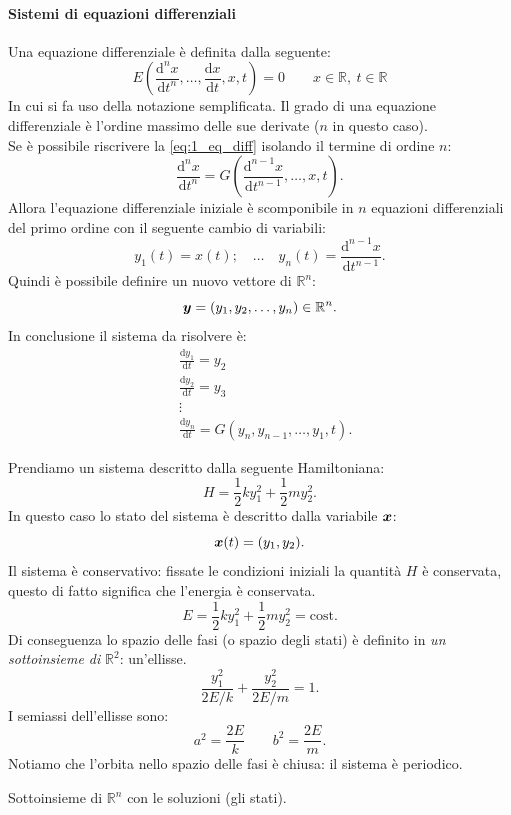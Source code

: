 \paragraph{Sistemi di equazioni differenziali}%
\label{par:Sistemi di equazioni differenziali}
Una equazione differenziale è definita dalla seguente:
\begin{equation}
    E\left(\frac{\text{d} ^n x}{\text{d} t^n} , \ldots, \frac{\text{d} x}{\text{d} t}, x, t\right) = 0 
    \qquad
    x \in \mathbb{R}, \ t \in \mathbb{R}
    \label{eq:1_eq_diff}
\end{equation}
In cui si fa uso della notazione semplificata. Il grado di una equazione differenziale è l'ordine massimo delle sue derivate ($n$ in questo caso).\\
Se è possibile riscrivere la \ref{eq:1_eq_diff} isolando il termine di ordine $n$:
\[
    \frac{\text{d}^n x}{\text{d} t^n} = G\left(\frac{\text{d} ^{n-1}x}{\text{d} t^{n-1}} , \ldots, x, t\right)
.\] 
Allora l'equazione differenziale iniziale è scomponibile in $n$  equazioni differenziali del primo ordine con il seguente cambio di variabili:
\[
    y_1(t) = x(t); \quad \ldots \quad y_n(t) = \frac{\text{d} ^{n-1}x}{\text{d} t^{n-1}} 
.\] 
Quindi è possibile definire un nuovo vettore di $\mathbb{R}^n$:
\[
    \boldsymbol{y}  = (y_1, y_2, \ldots, y_n) \in \mathbb{R}^n
.\] 
In conclusione il sistema da risolvere è:
\[\begin{aligned}
    & \frac{\text{d} y_1}{\text{d} t} = y_2\\
    & \frac{\text{d} y_2}{\text{d} t} = y_3\\
    & \vdots\\
    & \frac{\text{d} y_n}{\text{d} t} = G(y_n, y_{n-1}, \ldots, y_1, t)
.\end{aligned}\]
\begin{exmp}
    Prendiamo un sistema descritto dalla seguente Hamiltoniana:
    \[
        H = \frac{1}{2}ky_1^2 + \frac{1}{2}m y_2^2
    .\] 
    In questo caso lo stato del sistema è descritto dalla variabile $\boldsymbol{x}$:
    \[
	\boldsymbol{x}(t) = (y_1, y_2)
    .\] 
    Il sistema è conservativo: fissate le condizioni iniziali la quantità $H$ è conservata, questo di fatto significa che l'energia è conservata.
    \[
        E = \frac{1}{2}ky_1^2 + \frac{1}{2}m y_2^2 = \text{cost}
    .\] 
    Di conseguenza lo spazio delle fasi (o spazio degli stati) è definito in \textit{un sottoinsieme di }$\mathbb{R}^2$: un'ellisse.
    \[
        \frac{y_1^2}{2E /k} + \frac{y_2^2}{2E /m} = 1
    .\] 
    I semiassi dell'ellisse sono:
    \[
        a^2 = \frac{2E}{k} \qquad b^2 = \frac{2E}{m}
    .\] 
    Notiamo che l'orbita nello spazio delle fasi è chiusa: il sistema è periodico.
\end{exmp}
\noindent
\begin{defn}
    Sottoinsieme di $\mathbb{R}^n$ con le soluzioni (gli stati).
\end{defn}
\noindent
